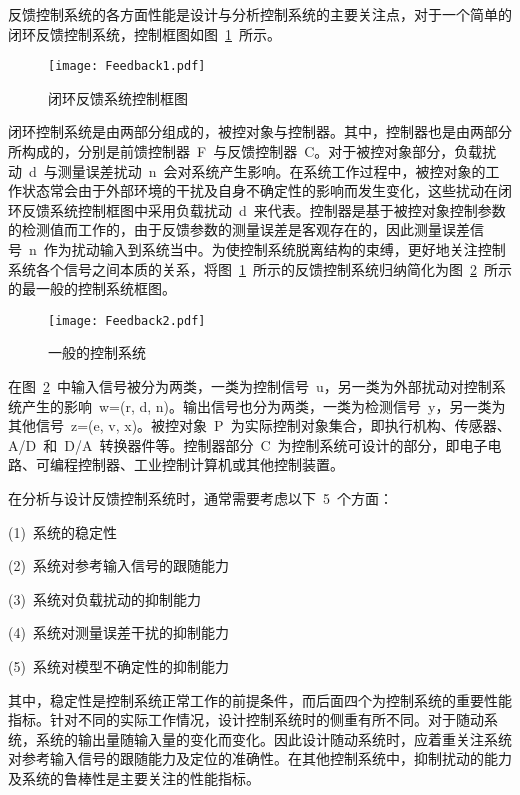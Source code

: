 反馈控制系统的各方面性能是设计与分析控制系统的主要关注点，对于一个简单的闭环反馈控制系统，控制框图如图~\ref{fig:chap2:feedback1}~所示。
\begin{figure}[h]
  \centering
     \texttt{[image: Feedback1.pdf]}\\
   \caption{闭环反馈系统控制框图}\label{fig:chap2:feedback1}
\end{figure}

闭环控制系统是由两部分组成的，被控对象与控制器。其中，控制器也是由两部分所构成的，分别是前馈控制器~F~与反馈控制器~C。对于被控对象部分，负载扰动~d~与测量误差扰动~n~会对系统产生影响。在系统工作过程中，被控对象的工作状态常会由于外部环境的干扰及自身不确定性的影响而发生变化，这些扰动在闭环反馈系统控制框图中采用负载扰动~d~来代表。控制器是基于被控对象控制参数的检测值而工作的，由于反馈参数的测量误差是客观存在的，因此测量误差信号~n~作为扰动输入到系统当中。为使控制系统脱离结构的束缚，更好地关注控制系统各个信号之间本质的关系，将图~\ref{fig:chap2:feedback1}~所示的反馈控制系统归纳简化为图~\ref{fig:chap2:feedback2}~所示的最一般的控制系统框图。
\begin{figure}[h]
  \centering
     \texttt{[image: Feedback2.pdf]}\\
   \caption{一般的控制系统}\label{fig:chap2:feedback2}
\end{figure}

在图~\ref{fig:chap2:feedback2}~中输入信号被分为两类，一类为控制信号~u，另一类为外部扰动对控制系统产生的影响~w=(r, d, n)。输出信号也分为两类，一类为检测信号~y，另一类为其他信号~z=(e, v, x)。被控对象~P~为实际控制对象集合，即执行机构、传感器、A/D~和~D/A~转换器件等。控制器部分~C~为控制系统可设计的部分，即电子电路、可编程控制器、工业控制计算机或其他控制装置。

在分析与设计反馈控制系统时，通常需要考虑以下~5~个方面：

(1)~系统的稳定性

(2)~系统对参考输入信号的跟随能力

(3)~系统对负载扰动的抑制能力

(4)~系统对测量误差干扰的抑制能力

(5)~系统对模型不确定性的抑制能力

其中，稳定性是控制系统正常工作的前提条件，而后面四个为控制系统的重要性能指标。针对不同的实际工作情况，设计控制系统时的侧重有所不同。对于随动系统，系统的输出量随输入量的变化而变化。因此设计随动系统时，应着重关注系统对参考输入信号的跟随能力及定位的准确性。在其他控制系统中，抑制扰动的能力及系统的鲁棒性是主要关注的性能指标。

